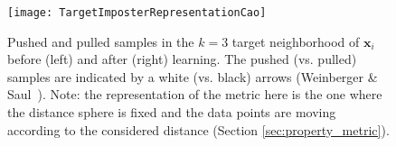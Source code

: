 \begin{figure}[h!]
	\centering
	\begin{minipage}[b]{0.80\linewidth}		
		\centerline{\texttt{[image: TargetImposterRepresentationCao]}}
	\end{minipage}
	\caption[Pushed and pulled samples in the $k=3$ target neighborhood of $\textbf{x}_i$ before (left) and after (right) learning.]{Pushed and pulled samples in the $k=3$ target neighborhood of $\textbf{x}_i$ before (left) and after (right) learning. The pushed (vs. pulled) samples are indicated by a white (vs. black) arrows (Weinberger \& Saul~\cite{Weinberger2009}). Note: the representation of the metric here is the one where the distance sphere is fixed and the data points are moving according to the considered distance (Section \ref{sec:property_metric}). }
	\label{fig:TargetImposterRepresentation}
\end{figure}


